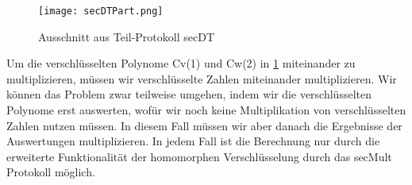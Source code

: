 \begin{figure}[h]
\begin{center}
\texttt{[image: secDTPart.png]}
\caption{Ausschnitt aus Teil-Protokoll secDT}
\cite{Doettling2021}
\label{secDT}
\end{center}

\end{figure}

Um die verschlüsselten Polynome Cv(1) und Cw(2) in \ref{secDT} miteinander zu multiplizieren, müssen wir verschlüsselte Zahlen miteinander multiplizieren. Wir können das Problem zwar teilweise umgehen, indem wir die verschlüsselten Polynome erst auswerten, wofür wir noch keine Multiplikation von verschlüsselten Zahlen nutzen müssen. In diesem Fall müssen wir aber danach die Ergebnisse der Auswertungen multiplizieren. In jedem Fall ist die Berechnung nur durch die erweiterte Funktionalität der homomorphen Verschlüsselung durch das secMult Protokoll möglich.


